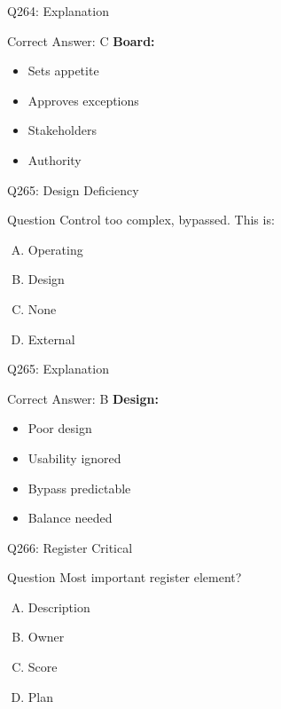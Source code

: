 \documentclass{beamer}
\begin{document}
	\begin{frame}{Q264: Explanation}
		\begin{block}{Correct Answer: C}
			\textbf{Board:}
			\begin{itemize}
				\item Sets appetite
				\item Approves exceptions
				\item Stakeholders
				\item Authority
			\end{itemize}
		\end{block}
	\end{frame}
	
	\begin{frame}{Q265: Design Deficiency}
		\begin{block}{Question}
			Control too complex, bypassed. This is:
		\end{block}
		\begin{enumerate}[(A)]
			\item Operating
			\item Design
			\item None
			\item External
		\end{enumerate}
	\end{frame}
	
	\begin{frame}{Q265: Explanation}
		\begin{block}{Correct Answer: B}
			\textbf{Design:}
			\begin{itemize}
				\item Poor design
				\item Usability ignored
				\item Bypass predictable
				\item Balance needed
			\end{itemize}
		\end{block}
	\end{frame}
	
	\begin{frame}{Q266: Register Critical}
		\begin{block}{Question}
			Most important register element?
		\end{block}
		\begin{enumerate}[(A)]
			\item Description
			\item Owner
			\item Score
			\item Plan
		\end{enumerate}
	\end{frame}
	
\end{document}
